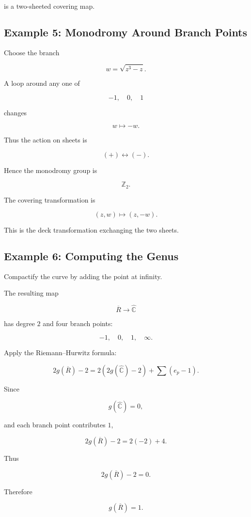 \documentclass[12pt,a4paper]{article}
\theoremstyle{notespace}
\begin{document}
is a two-sheeted covering map.

\bigskip

\subsection{Example 5: Monodromy Around Branch Points}

Choose the branch

\[
w=\sqrt{z^3-z}.
\]

A loop around any one of

\[
-1,\quad0,\quad1
\]

changes

\[
w
\mapsto
-w.
\]

Thus the action on sheets is

\[
(+)\leftrightarrow(-).
\]

Hence the monodromy group is

\[
\mathbb Z_2.
\]

The covering transformation is

\[
(z,w)
\longmapsto
(z,-w).
\]

This is the deck transformation exchanging the two sheets.

\bigskip

\subsection{Example 6: Computing the Genus}

Compactify the curve by adding the point at infinity.

The resulting map

\[
\overline R
\to
\widehat{\mathbb C}
\]

has degree \(2\) and four branch points:

\[
-1,\quad0,\quad1,\quad\infty.
\]

Apply the Riemann--Hurwitz formula:

\[
2g(\overline R)-2
=
2(2g(\widehat{\mathbb C})-2)
+
\sum(e_p-1).
\]

Since

\[
g(\widehat{\mathbb C})=0,
\]

and each branch point contributes \(1\),

\[
2g(\overline R)-2
=
2(-2)+4.
\]

Thus

\[
2g(\overline R)-2=0.
\]

Therefore

\[
g(\overline R)=1.
\]
\end{document}
